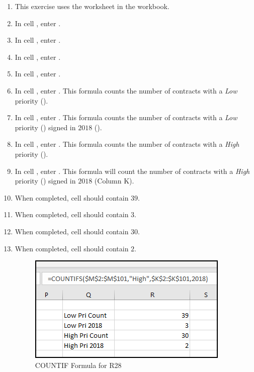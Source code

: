 \begin{enumbox}
	\begin{enumerate}
		\item This exercise uses the  worksheet in the  workbook.
		\item In cell , enter .
		\item In cell , enter .
		\item In cell , enter .
		\item In cell , enter .
		\item In cell , enter . This formula counts the number of contracts with a \textit{Low} priority ().
		\item In cell , enter . This formula counts the number of contracts with a \textit{Low} priority () signed in $ 2018 $ ().
		\item In cell , enter . This formula counts the number of contracts with a \textit{High} priority ().
		\item In cell , enter . This formula will count the number of contracts with a \textit{High} priority () signed in $ 2018 $ (Column K).
		\item When completed, cell  should contain $ 39 $.
		\item When completed, cell  should contain $ 3 $.
		\item When completed, cell  should contain $ 30 $.
		\item When completed, cell  should contain $ 2 $.
		
		\begin{figure}[H]
			\centering
			\includegraphics[width=\maxwidth{.75\linewidth}]{gfx/ch09_fig43}
			\caption{COUNTIF Formula for R28}
			\label{09:fig43}
		\end{figure}
			
	\end{enumerate}
\end{enumbox}
	
